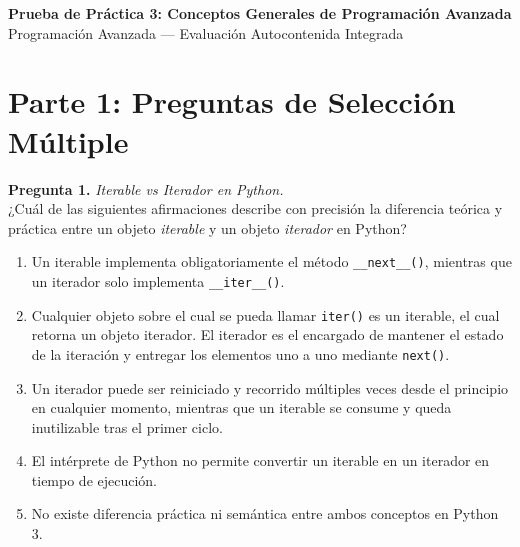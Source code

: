 \documentclass[12pt,letterpaper]{article}
\begin{document}
\begin{center}
  {\large \textbf{Prueba de Práctica 3: Conceptos Generales de Programación Avanzada}} \\
  \medskip
  {Programación Avanzada --- Evaluación Autocontenida Integrada}
\end{center}

\bigskip

\section*{Parte 1: Preguntas de Selección Múltiple}

\textbf{Pregunta 1.} \textit{Iterable vs Iterador en Python.} \\
¿Cuál de las siguientes afirmaciones describe con precisión la diferencia teórica y práctica entre un objeto \textit{iterable} y un objeto \textit{iterador} en Python?
\begin{enumerate}[label=\alph*)]
  \item Un iterable implementa obligatoriamente el método \texttt{\_\_next\_\_()}, mientras que un iterador solo implementa \texttt{\_\_iter\_\_()}.
  \item Cualquier objeto sobre el cual se pueda llamar \texttt{iter()} es un iterable, el cual retorna un objeto iterador. El iterador es el encargado de mantener el estado de la iteración y entregar los elementos uno a uno mediante \texttt{next()}.
  \item Un iterador puede ser reiniciado y recorrido múltiples veces desde el principio en cualquier momento, mientras que un iterable se consume y queda inutilizable tras el primer ciclo.
  \item El intérprete de Python no permite convertir un iterable en un iterador en tiempo de ejecución.
  \item No existe diferencia práctica ni semántica entre ambos conceptos en Python 3.
\end{enumerate}

\bigskip
\end{document}
